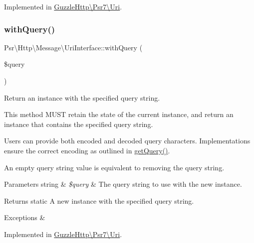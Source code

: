 Implemented in \hyperlink{classGuzzleHttp_1_1Psr7_1_1Uri_af06111c4b19c09ce8f1902b803016950}{Guzzle\+Http\textbackslash{}\+Psr7\textbackslash{}\+Uri}.

\mbox{\label{interfacePsr_1_1Http_1_1Message_1_1UriInterface_a66f1ac4196c69ab824c408e2d6e89b10}} 
\subsubsection{\texorpdfstring{with\+Query()}{withQuery()}}
{\footnotesize\ttfamily Psr\textbackslash{}\+Http\textbackslash{}\+Message\textbackslash{}\+Uri\+Interface\+::with\+Query (\begin{DoxyParamCaption}\item[{}]{\$query }\end{DoxyParamCaption})}

Return an instance with the specified query string.

This method M\+U\+ST retain the state of the current instance, and return an instance that contains the specified query string.

Users can provide both encoded and decoded query characters. Implementations ensure the correct encoding as outlined in \hyperlink{interfacePsr_1_1Http_1_1Message_1_1UriInterface_a859c8c892d038ba2f1a92b1dfa806ecc}{get\+Query()}.

An empty query string value is equivalent to removing the query string.


\begin{DoxyParams}[1]{Parameters}
string & {\em \$query} & The query string to use with the new instance. \\
\hline
\end{DoxyParams}
\begin{DoxyReturn}{Returns}
static A new instance with the specified query string. 
\end{DoxyReturn}

\begin{DoxyExceptions}{Exceptions}
{\em } & \\
\hline
\end{DoxyExceptions}


Implemented in \hyperlink{classGuzzleHttp_1_1Psr7_1_1Uri_a7b73f53c542c9508b14d5f002699560e}{Guzzle\+Http\textbackslash{}\+Psr7\textbackslash{}\+Uri}.

